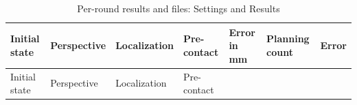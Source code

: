 \FloatBarrier\begingroup\small\setlength{\tabcolsep}{2.5pt}
\begin{longtable}[]{@{}
  >{\raggedleft\arraybackslash}p{}
  >{\raggedright\arraybackslash}p{}
  >{\raggedright\arraybackslash}p{}
  >{\raggedright\arraybackslash}p{}
  >{\raggedleft\arraybackslash}p{}
  >{\raggedleft\arraybackslash}p{}
  >{\raggedright\arraybackslash}p{}@{}}
\caption{Per-round results and files: Settings and Results}\label{tab:s19-2}\tabularnewline
\toprule\noalign{}
\begin{minipage}[b]{\linewidth}\raggedleft
Initial state
\end{minipage} & \begin{minipage}[b]{\linewidth}\raggedright
Perspective
\end{minipage} & \begin{minipage}[b]{\linewidth}\raggedright
Localization
\end{minipage} & \begin{minipage}[b]{\linewidth}\raggedright
Pre-contact
\end{minipage} & \begin{minipage}[b]{\linewidth}\raggedleft
Error in mm
\end{minipage} & \begin{minipage}[b]{\linewidth}\raggedleft
Planning count
\end{minipage} & \begin{minipage}[b]{\linewidth}\raggedright
Error
\end{minipage} \\
\midrule\noalign{}
\endfirsthead
\toprule\noalign{}
\begin{minipage}[b]{\linewidth}\raggedleft
Initial state
\end{minipage} & \begin{minipage}[b]{\linewidth}\raggedright
Perspective
\end{minipage} & \begin{minipage}[b]{\linewidth}\raggedright
Localization
\end{minipage} & \begin{minipage}[b]{\linewidth}\raggedright
Pre-contact
\end{minipage} & \begin{minipage}[b]{\linewidth}\raggedleft

\end{minipage}
\end{longtable}
